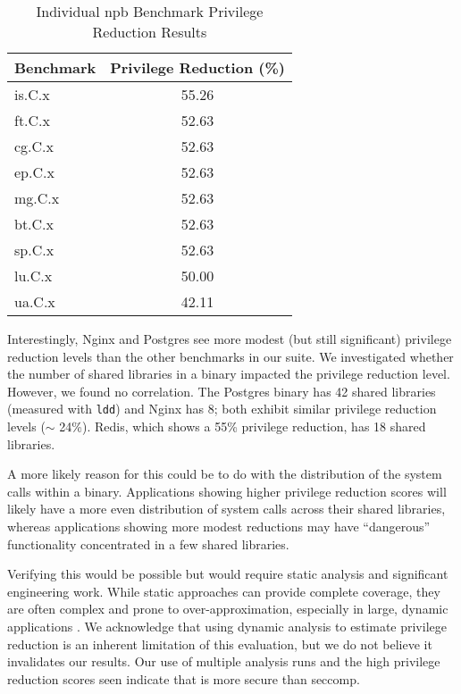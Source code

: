 \begin{table}[ht]
  \centering
  \caption{Individual \ac{npb} Benchmark Privilege Reduction Results}
  \label{tab:npb_individual_sorted}
  \begin{tabular}{l S[table-format=2.2]}
    \toprule
    Benchmark & {Privilege Reduction (\%)} \\ %
    \midrule
    is.C.x    & 55.26 \\ 
    ft.C.x    & 52.63 \\
    cg.C.x    & 52.63 \\
    ep.C.x    & 52.63 \\
    mg.C.x    & 52.63 \\
    bt.C.x    & 52.63 \\
    sp.C.x    & 52.63 \\
    lu.C.x    & 50.00 \\
    ua.C.x    & 42.11 \\ 
    \bottomrule
  \end{tabular}
\end{table}

Interestingly, Nginx and Postgres see more modest (but still significant) privilege reduction levels than the other benchmarks in our suite. We
investigated whether the number of shared libraries in a binary impacted the privilege reduction level. However, we found no correlation. The Postgres
binary has 42 shared libraries (measured with \texttt{ldd}) and Nginx has 8; 
both exhibit similar privilege reduction levels ($\sim$ 24\%). Redis, which
shows a 55\% privilege reduction, has 18 shared libraries. 

A more likely reason for this could be to do with the distribution of the system
calls within a binary. Applications showing higher privilege reduction scores
will likely have a more even distribution of system calls across their shared
libraries, whereas applications showing more modest reductions may have
``dangerous'' functionality concentrated in a few shared libraries.

Verifying this would be possible but would require static analysis and significant engineering work. While static approaches can provide
complete coverage, they are often complex and prone to over-approximation, 
especially in large, dynamic applications \cite{ernst2007daikon}. We
acknowledge that using dynamic analysis to estimate privilege reduction
is an inherent limitation of this evaluation, but we do not believe it
invalidates our results. Our use of multiple analysis runs and the
high privilege reduction scores seen indicate that \af is more secure than
seccomp. 

